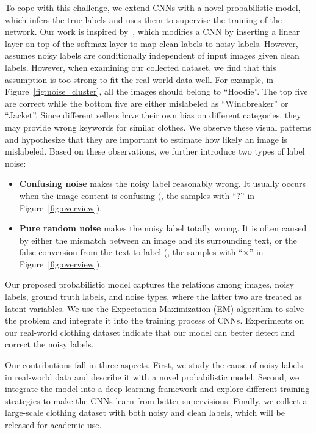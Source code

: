 \documentclass[10pt,twocolumn,letterpaper]{article}
\begin{document}
To cope with this challenge, we extend CNNs with a novel probabilistic model, which infers the true labels and uses them to supervise the training of the network. Our work is inspired by~\cite{sukhbaatar2014learning}, which modifies a CNN by inserting a linear layer on top of the softmax layer to map clean labels to noisy labels. However,~\cite{sukhbaatar2014learning} assumes noisy labels are conditionally independent of input images given clean labels. However, when examining our collected dataset, we find that this assumption is too strong to fit the real-world data well. For example, in Figure~\ref{fig:noise_cluster}, all the images should belong to ``Hoodie''. The top five are correct while the bottom five are either mislabeled as ``Windbreaker'' or ``Jacket''. Since different sellers have their own bias on different categories, they may provide wrong keywords for similar clothes. We observe these visual patterns and hypothesize that they are important to estimate how likely an image is mislabeled. Based on these observations, we further introduce two types of label noise:
\begin{itemize}
\item \textbf{Confusing noise} makes the noisy label reasonably wrong. It usually occurs when the image content is confusing (\eg, the samples with ``?'' in Figure~\ref{fig:overview}).
\item \textbf{Pure random noise} makes the noisy label totally wrong. It is often caused by either the mismatch between an image and its surrounding text, or the false conversion from the text to label (\eg, the samples with ``$\times$'' in Figure~\ref{fig:overview}).
\end{itemize}

Our proposed probabilistic model captures the relations among images, noisy labels, ground truth labels, and noise types, where the latter two are treated as latent variables. We use the Expectation-Maximization (EM) algorithm to solve the problem and integrate it into the training process of CNNs. Experiments on our real-world clothing dataset indicate that our model can better detect and correct the noisy labels.

Our contributions fall in three aspects. First, we study the cause of noisy labels in real-world data and describe it with a novel probabilistic model. Second, we integrate the model into a deep learning framework and explore different training strategies to make the CNNs learn from better supervisions. Finally, we collect a large-scale clothing dataset with both noisy and clean labels, which will be released for academic use.
\end{document}
